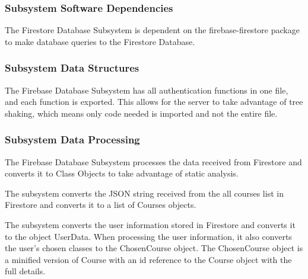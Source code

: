

\subsubsection{Subsystem Software Dependencies}
The Firestore Database Subsystem is dependent on the firebase-firestore package to make database queries to the Firestore Database.


\subsubsection{Subsystem Data Structures}
The Firebase Database Subsystem has all authentication functions in one file, and each function is exported. This allows for the server to take advantage of tree shaking, which means only code needed is imported and not the entire file.

\subsubsection{Subsystem Data Processing}
The Firebase Database Subsystem processes the data received from Firestore and converts it to Class Objects to take advantage of static analysis.

The subsystem converts the JSON string received from the all courses list in Firestore and converts it to a list of Courses objects.

The subsystem converts the user information stored in Firestore and converts it to the object UserData. When processing the user information, it also converts the user's chosen classes to the ChosenCourse object. The ChosenCourse object is a minified version of Course with an id reference to the Course object with the full details.
